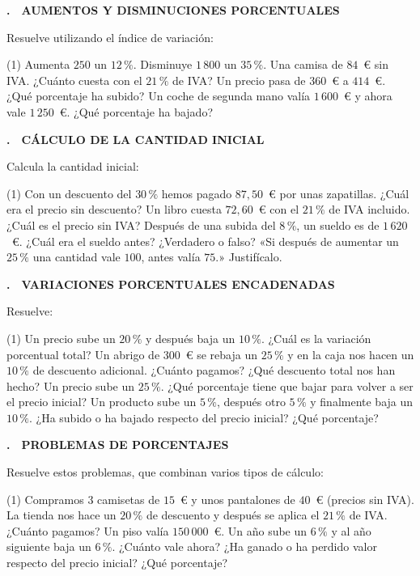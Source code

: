 \documentclass[11pt,a4paper]{article}
\newcounter{exer}
\newcommand{\ex}[2]{\par\needspace{5\baselineskip}\bigskip\stepcounter{exer}\noindent
  {\color{cursfosc}\bfseries\theexer.}\ \ {\scriptsize\bfseries\color{curs}\MakeUppercase{#1}}\par\nopagebreak\smallskip
  \noindent #2\par}
\begin{document}
\ex{Aumentos y disminuciones porcentuales}{Resuelve utilizando el índice de variación:}
\begin{tasks}(1)
  \task Aumenta $250$ un $12\,\%$.
  \task Disminuye $1\,800$ un $35\,\%$.
  \task Una camisa de $84$~€ sin IVA. ¿Cuánto cuesta con el $21\,\%$ de IVA?
  \task Un precio pasa de $360$~€ a $414$~€. ¿Qué porcentaje ha subido?
  \task Un coche de segunda mano valía $1\,600$~€ y ahora vale $1\,250$~€. ¿Qué porcentaje ha bajado?
\end{tasks}

\ex{Cálculo de la cantidad inicial}{Calcula la cantidad inicial:}
\begin{tasks}(1)
  \task Con un descuento del $30\,\%$ hemos pagado $87,50$~€ por unas zapatillas. ¿Cuál era el precio sin descuento?
  \task Un libro cuesta $72,60$~€ con el $21\,\%$ de IVA incluido. ¿Cuál es el precio sin IVA?
  \task Después de una subida del $8\,\%$, un sueldo es de $1\,620$~€. ¿Cuál era el sueldo antes?
  \task ¿Verdadero o falso? «Si después de aumentar un $25\,\%$ una cantidad vale $100$, antes valía $75$.» Justifícalo.
\end{tasks}

\ex{Variaciones porcentuales encadenadas}{Resuelve:}
\begin{tasks}(1)
  \task Un precio sube un $20\,\%$ y después baja un $10\,\%$. ¿Cuál es la variación porcentual total?
  \task Un abrigo de $300$~€ se rebaja un $25\,\%$ y en la caja nos hacen un $10\,\%$ de descuento adicional. ¿Cuánto pagamos? ¿Qué descuento total nos han hecho?
  \task Un precio sube un $25\,\%$. ¿Qué porcentaje tiene que bajar para volver a ser el precio inicial?
  \task Un producto sube un $5\,\%$, después otro $5\,\%$ y finalmente baja un $10\,\%$. ¿Ha subido o ha bajado respecto del precio inicial? ¿Qué porcentaje?
\end{tasks}

\ex{Problemas de porcentajes}{Resuelve estos problemas, que combinan varios tipos de cálculo:}
\begin{tasks}(1)
  \task Compramos $3$ camisetas de $15$~€ y unos pantalones de $40$~€ (precios sin IVA). La tienda nos hace un $20\,\%$ de descuento y después se aplica el $21\,\%$ de IVA. ¿Cuánto pagamos?
  \task Un piso valía $150\,000$~€. Un año sube un $6\,\%$ y al año siguiente baja un $6\,\%$. ¿Cuánto vale ahora? ¿Ha ganado o ha perdido valor respecto del precio inicial? ¿Qué porcentaje?
\end{tasks}
\end{document}
